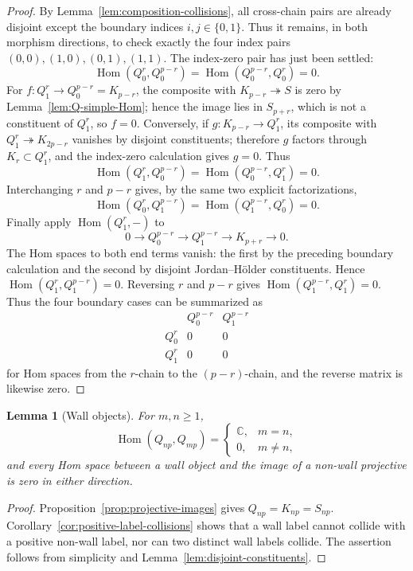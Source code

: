 \documentclass[12pt,leqno]{amsart}
\numberwithin{equation}{section}
\newtheorem{lem}[thm]{Lemma}
\newcommand{\Hom}{\operatorname{Hom}}
\def\C{\mathbb{C}}
\begin{document}
\begin{proof}
By Lemma~\ref{lem:composition-collisions}, all cross-chain pairs are
already disjoint except the boundary indices $i,j\in\{0,1\}$.  Thus it
remains, in both morphism directions, to check exactly the four index
pairs $(0,0),(1,0),(0,1),(1,1)$.  The index-zero pair has just been
settled:
\[
 \Hom(Q_0^r,Q_0^{p-r})=
 \Hom(Q_0^{p-r},Q_0^r)=0.
\]
For $f:Q^r_1\to Q^{p-r}_0=K_{p-r}$, the composite with
$K_{p-r}\twoheadrightarrow S$ is zero by
Lemma~\ref{lem:Q-simple-Hom}; hence the image lies in $S_{p+r}$, which is
not a constituent of $Q^r_1$, so $f=0$.  Conversely, if
$g:K_{p-r}\to Q^r_1$, its composite with
$Q^r_1\twoheadrightarrow K_{2p-r}$ vanishes by disjoint constituents;
therefore $g$ factors through $K_r\subset Q^r_1$, and the index-zero
calculation gives $g=0$.  Thus
\[
 \Hom(Q_1^r,Q_0^{p-r})=
 \Hom(Q_0^{p-r},Q_1^r)=0.
\]
Interchanging $r$ and $p-r$ gives, by the same two explicit
factorizations,
\[
 \Hom(Q_0^r,Q_1^{p-r})=
 \Hom(Q_1^{p-r},Q_0^r)=0.
\]
Finally apply $\Hom(Q_1^r,-)$ to
\[
 0\to Q_0^{p-r}\to Q_1^{p-r}\to K_{p+r}\to0.
\]
The Hom spaces to both end terms vanish: the first by the preceding
boundary calculation and the second by disjoint Jordan--H\"older
constituents.  Hence $\Hom(Q_1^r,Q_1^{p-r})=0$.  Reversing $r$ and
$p-r$ gives $\Hom(Q_1^{p-r},Q_1^r)=0$.  Thus the four boundary cases can
be summarized as
\[
\begin{array}{c|cc}
 &Q_0^{p-r}&Q_1^{p-r}\\ \hline
 Q_0^r&0&0\\
 Q_1^r&0&0
\end{array}
\]
for Hom spaces from the $r$-chain to the $(p-r)$-chain, and the reverse
matrix is likewise zero.
\end{proof}

\begin{lem}[Wall objects]\label{lem:wall-Hom}
For $m,n\geq1$,
\[
 \Hom(Q_{np},Q_{mp})=
 \begin{cases}\C,&m=n,\\0,&m\neq n,\end{cases}
\]
and every Hom space between a wall object and the image of a non-wall
projective is zero in either direction.
\end{lem}

\begin{proof}
Proposition~\ref{prop:projective-images} gives
$Q_{np}=K_{np}=S_{np}$.  Corollary~\ref{cor:positive-label-collisions}
shows that a wall label cannot collide with a positive non-wall label, nor
can two distinct wall labels collide.  The assertion follows from
simplicity and Lemma~\ref{lem:disjoint-constituents}.
\end{proof}
\end{document}
